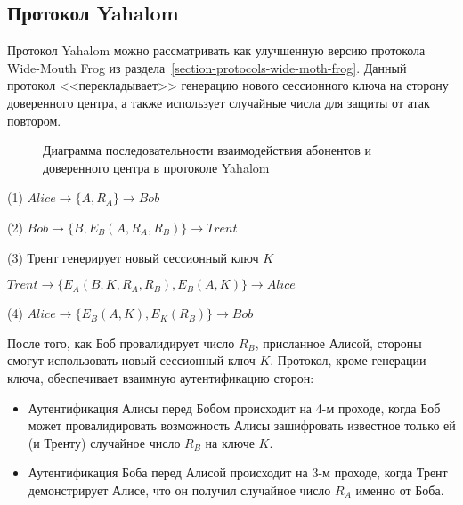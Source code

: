 \subsection{Протокол Yahalom}\label{section-protocols-yahalom}

Протокол Yahalom можно рассматривать как улучшенную версию протокола Wide-Mouth Frog из раздела~\ref{section-protocols-wide-moth-frog}. Данный протокол <<перекладывает>> генерацию нового сессионного ключа на сторону доверенного центра, а также использует случайные числа для защиты от атак повтором.

\begin{figure}[thb]
	\centering
	\begin{sequencediagram}

	\end{sequencediagram}
	\caption{Диаграмма последовательности взаимодействия абонентов и доверенного центра в протоколе Yahalom\label{fig:key_distribution-yahalom}}
\end{figure}

\begin{protocol}
	\item[(1)] $Alice \to \{ A, R_A \} \to Bob$
	\item[(2)] $Bob \to \{ B, E_B( A, R_A, R_B ) \} \to Trent$
	\item[(3)] Трент генерирует новый сессионный ключ $K$
	\item[{}] $Trent \to \{ E_A( B, K, R_A, R_B ), E_B(A, K) \} \to Alice$
	\item[(4)] $Alice \to \{ E_B( A, K ), E_K( R_B ) \} \to Bob$
\end{protocol}

После того, как Боб провалидирует число $R_B$, присланное Алисой, стороны смогут использовать новый сессионный ключ $K$. Протокол, кроме генерации ключа, обеспечивает взаимную аутентификацию сторон:

\begin{itemize}
    \item Аутентификация Алисы перед Бобом происходит на 4-м проходе, когда Боб может провалидировать возможность Алисы зашифровать известное только ей (и Тренту) случайное число $R_B$ на ключе $K$.
    \item Аутентификация Боба перед Алисой происходит на 3-м проходе, когда Трент демонстрирует Алисе, что он получил случайное число $R_A$ именно от Боба.
\end{itemize}

